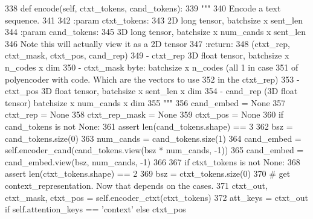 \begin{DoxyCode}
338     \textcolor{keyword}{def }encode(self, ctxt\_tokens, cand\_tokens):
339         \textcolor{stringliteral}{"""}
340 \textcolor{stringliteral}{        Encode a text sequence.}
341 \textcolor{stringliteral}{}
342 \textcolor{stringliteral}{        :param ctxt\_tokens:}
343 \textcolor{stringliteral}{            2D long tensor, batchsize x sent\_len}
344 \textcolor{stringliteral}{        :param cand\_tokens:}
345 \textcolor{stringliteral}{            3D long tensor, batchsize x num\_cands x sent\_len}
346 \textcolor{stringliteral}{            Note this will actually view it as a 2D tensor}
347 \textcolor{stringliteral}{        :return:}
348 \textcolor{stringliteral}{            (ctxt\_rep, ctxt\_mask, ctxt\_pos, cand\_rep)}
349 \textcolor{stringliteral}{            - ctxt\_rep 3D float tensor, batchsize x n\_codes x dim}
350 \textcolor{stringliteral}{            - ctxt\_mask byte:  batchsize x n\_codes (all 1 in case}
351 \textcolor{stringliteral}{            of polyencoder with code. Which are the vectors to use}
352 \textcolor{stringliteral}{            in the ctxt\_rep)}
353 \textcolor{stringliteral}{            - ctxt\_pos 3D float tensor, batchsize x sent\_len x dim}
354 \textcolor{stringliteral}{            - cand\_rep (3D float tensor) batchsize x num\_cands x dim}
355 \textcolor{stringliteral}{        """}
356         cand\_embed = \textcolor{keywordtype}{None}
357         ctxt\_rep = \textcolor{keywordtype}{None}
358         ctxt\_rep\_mask = \textcolor{keywordtype}{None}
359         ctxt\_pos = \textcolor{keywordtype}{None}
360         \textcolor{keywordflow}{if} cand\_tokens \textcolor{keywordflow}{is} \textcolor{keywordflow}{not} \textcolor{keywordtype}{None}:
361             \textcolor{keyword}{assert} len(cand\_tokens.shape) == 3
362             bsz = cand\_tokens.size(0)
363             num\_cands = cand\_tokens.size(1)
364             cand\_embed = self.encoder\_cand(cand\_tokens.view(bsz * num\_cands, -1))
365             cand\_embed = cand\_embed.view(bsz, num\_cands, -1)
366 
367         \textcolor{keywordflow}{if} ctxt\_tokens \textcolor{keywordflow}{is} \textcolor{keywordflow}{not} \textcolor{keywordtype}{None}:
368             \textcolor{keyword}{assert} len(ctxt\_tokens.shape) == 2
369             bsz = ctxt\_tokens.size(0)
370             \textcolor{comment}{# get context\_representation. Now that depends on the cases.}
371             ctxt\_out, ctxt\_mask, ctxt\_pos = self.encoder\_ctxt(ctxt\_tokens)
372             att\_keys = ctxt\_out \textcolor{keywordflow}{if} self.attention\_keys == \textcolor{stringliteral}{'context'} \textcolor{keywordflow}{else} ctxt\_pos

\end{DoxyCode}
